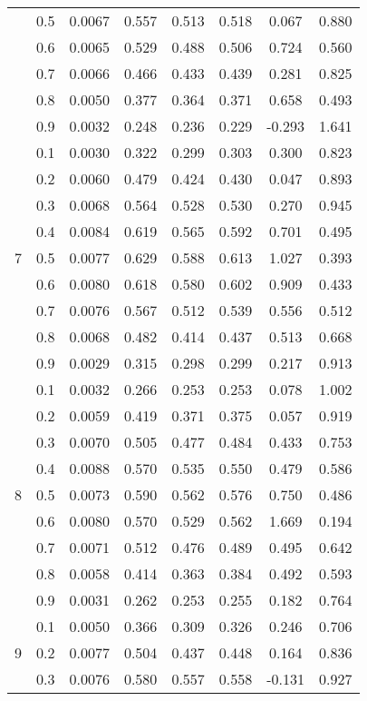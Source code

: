 \documentclass[11pt,a4paper]{report}
\begin{document}
\begin{longtable}{ | c | c || c | c | c | c | c | c | }
 & 0.5 & 0.0067 & 0.557 & 0.513 & 0.518 & 0.067 & 0.880 \\
 & 0.6 & 0.0065 & 0.529 & 0.488 & 0.506 & 0.724 & 0.560 \\
 & 0.7 & 0.0066 & 0.466 & 0.433 & 0.439 & 0.281 & 0.825 \\
 & 0.8 & 0.0050 & 0.377 & 0.364 & 0.371 & 0.658 & 0.493 \\
 & 0.9 & 0.0032 & 0.248 & 0.236 & 0.229 & -0.293 & 1.641 \\
 \hline
\multirow{9}{*}{7} & 0.1 & 0.0030 & 0.322 & 0.299 & 0.303 & 0.300 & 0.823 \\
 & 0.2 & 0.0060 & 0.479 & 0.424 & 0.430 & 0.047 & 0.893 \\
 & 0.3 & 0.0068 & 0.564 & 0.528 & 0.530 & 0.270 & 0.945 \\
 & 0.4 & 0.0084 & 0.619 & 0.565 & 0.592 & 0.701 & 0.495 \\
 & 0.5 & 0.0077 & 0.629 & 0.588 & 0.613 & 1.027 & 0.393 \\
 & 0.6 & 0.0080 & 0.618 & 0.580 & 0.602 & 0.909 & 0.433 \\
 & 0.7 & 0.0076 & 0.567 & 0.512 & 0.539 & 0.556 & 0.512 \\
 & 0.8 & 0.0068 & 0.482 & 0.414 & 0.437 & 0.513 & 0.668 \\
 & 0.9 & 0.0029 & 0.315 & 0.298 & 0.299 & 0.217 & 0.913 \\
 \hline
\multirow{9}{*}{8} & 0.1 & 0.0032 & 0.266 & 0.253 & 0.253 & 0.078 & 1.002 \\
 & 0.2 & 0.0059 & 0.419 & 0.371 & 0.375 & 0.057 & 0.919 \\
 & 0.3 & 0.0070 & 0.505 & 0.477 & 0.484 & 0.433 & 0.753 \\
 & 0.4 & 0.0088 & 0.570 & 0.535 & 0.550 & 0.479 & 0.586 \\
 & 0.5 & 0.0073 & 0.590 & 0.562 & 0.576 & 0.750 & 0.486 \\
 & 0.6 & 0.0080 & 0.570 & 0.529 & 0.562 & 1.669 & 0.194 \\
 & 0.7 & 0.0071 & 0.512 & 0.476 & 0.489 & 0.495 & 0.642 \\
 & 0.8 & 0.0058 & 0.414 & 0.363 & 0.384 & 0.492 & 0.593 \\
 & 0.9 & 0.0031 & 0.262 & 0.253 & 0.255 & 0.182 & 0.764 \\
 \hline
\multirow{9}{*}{9} & 0.1 & 0.0050 & 0.366 & 0.309 & 0.326 & 0.246 & 0.706 \\
 & 0.2 & 0.0077 & 0.504 & 0.437 & 0.448 & 0.164 & 0.836 \\
 & 0.3 & 0.0076 & 0.580 & 0.557 & 0.558 & -0.131 & 0.927 \\

\end{longtable}
\end{document}
